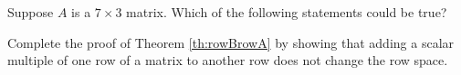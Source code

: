 \documentclass{ximera}
\begin{document}
\begin{problem}\label{prob:truefalse7by3}
Suppose $A$ is a $7\times 3$ matrix.  Which of the following statements could be true?
\begin{selectAll}
 \end{selectAll}
\end{problem}

\begin{problem}\label{prob:proofofrowBrowA}
Complete the proof of Theorem \ref{th:rowBrowA} by showing that adding a scalar multiple of one row of a matrix to another row does not change the row space.
\end{problem}
\end{document}
